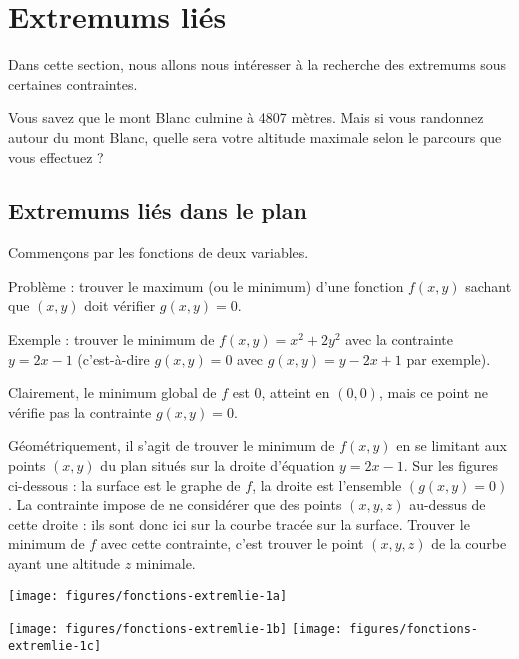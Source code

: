 \documentclass[11pt, class=report,crop=false]{standalone}
\begin{document}
\section{Extremums liés}

Dans cette section, nous allons nous intéresser à la recherche des extremums sous certaines contraintes.

Vous savez que le mont Blanc culmine à 4807 mètres. Mais si vous randonnez autour du mont Blanc, quelle sera votre altitude maximale selon le parcours que vous effectuez ?

\subsection{Extremums liés dans le plan}

Commençons par les fonctions de deux variables. 

Problème : trouver le maximum (ou le minimum) d'une fonction $f(x,y)$ sachant que $(x,y)$ doit vérifier $g(x,y)=0$.

Exemple : trouver le minimum de $f(x,y) = x^2 + 2y^2$ avec la contrainte $y = 2x-1$ (c'est-à-dire $g(x,y)=0$ avec $g(x,y)=y-2x+1$ par exemple).

Clairement, le minimum global de $f$ est $0$, atteint en $(0,0)$, mais ce point ne vérifie pas la contrainte $g(x,y)=0$.

Géométriquement, il s'agit de trouver le minimum de $f(x,y)$ en se limitant aux points $(x,y)$ du plan situés sur la droite d'équation $y=2x-1$.
Sur les figures ci-dessous : la surface est le graphe de $f$, la droite est l'ensemble $(g(x,y)=0)$. La contrainte impose de ne considérer que des points $(x,y,z)$ au-dessus de cette droite : ils sont donc ici sur la courbe tracée sur la surface.
Trouver le minimum de $f$ avec cette contrainte, c'est trouver le point $(x,y,z)$ de la courbe ayant une altitude $z$ minimale. 

\begin{center}
\texttt{[image: figures/fonctions-extremlie-1a]}

\texttt{[image: figures/fonctions-extremlie-1b]}
\texttt{[image: figures/fonctions-extremlie-1c]}
\end{center}

\end{document}
